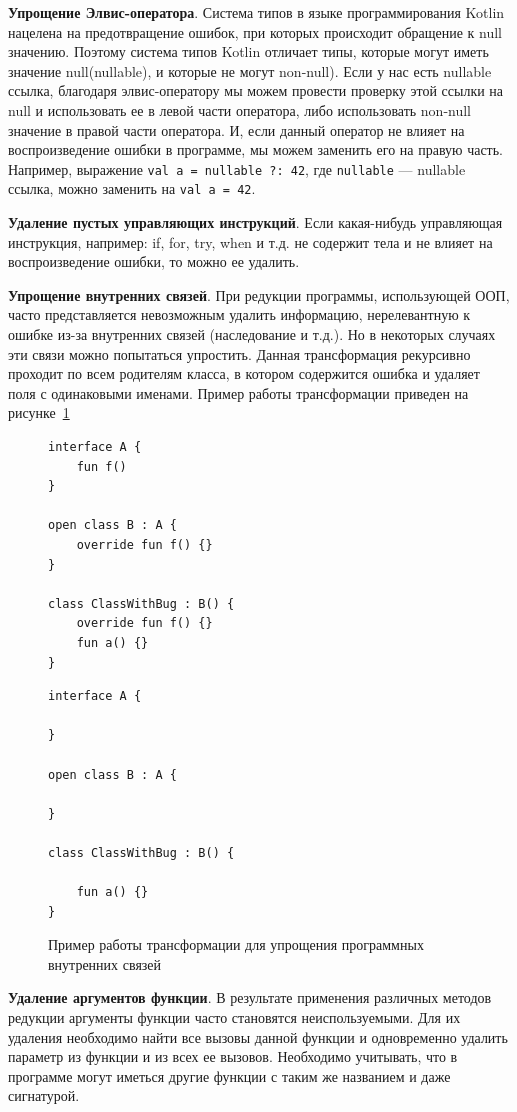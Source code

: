 \textbf{Упрощение Элвис-оператора}. Система типов в языке программирования Kotlin нацелена на предотвращение ошибок, при которых происходит обращение к null значению. Поэтому система типов Kotlin отличает типы, которые могут иметь значение null(nullable), и которые не могут non-null). Если у нас есть nullable ссылка, благодаря элвис-оператору мы можем провести проверку этой ссылки на null и использовать ее в левой части оператора, либо использовать non-null значение в правой части оператора. И, если данный оператор не влияет на воспроизведение ошибки в программе, мы можем заменить его на правую часть. Например, выражение \texttt{val a = nullable ?: 42}, где \texttt{nullable} --- nullable ссылка, можно заменить на \texttt{val a = 42}.

\textbf{Удаление пустых управляющих инструкций}. Если какая-нибудь управляющая инструкция, например: if, for, try, when и т.д. не содержит тела и не влияет на воспроизведение ошибки, то можно ее удалить.

\textbf{Упрощение внутренних связей}. При редукции программы, использующей ООП, часто представляется невозможным удалить информацию, нерелевантную к ошибке из-за внутренних связей (наследование и т.д.). Но в некоторых случаях эти связи можно попытаться упростить. Данная трансформация рекурсивно проходит по всем родителям класса, в котором содержится ошибка и удаляет поля с одинаковыми именами. Пример работы трансформации приведен на рисунке~\ref{ex:inh}
\begin{figure}
\begin{lstlisting}
interface A {
    fun f()
}

open class B : A {
    override fun f() {}
}

class ClassWithBug : B() {
    override fun f() {}
    fun a() {}
}
\end{lstlisting}
\begin{lstlisting}
interface A {

}

open class B : A {

}

class ClassWithBug : B() {

    fun a() {}
}
\end{lstlisting}
\caption{\label{ex:inh}Пример работы трансформации для упрощения программных внутренних связей}
\end{figure}

\textbf{Удаление аргументов функции}. В результате применения различных методов редукции аргументы функции часто становятся неиспользуемыми. Для их удаления необходимо найти все вызовы данной функции и одновременно удалить параметр из функции и из всех ее вызовов. Необходимо учитывать, что в программе могут иметься другие функции с таким же названием и даже сигнатурой.

